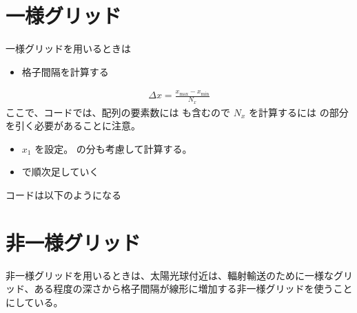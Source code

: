 \documentclass[letterpaper,10pt,dvipdfmx,report]{sphinxmanual}
\begin{document}
\section{一様グリッド}
\label{\detokenize{geometry:id2}}
一様グリッドを用いるときは
\begin{itemize}
\item {} 
格子間隔を計算する

\end{itemize}
\begin{equation*}
\begin{split}\Delta x = \frac{x_\mathrm{max} - x_\mathrm{min}}{N_x}\end{split}
\end{equation*}
ここで、コードでは、配列の要素数には  も含むので
\(N_x\) を計算するには  の部分を引く必要があることに注意。
\begin{itemize}
\item {} 
\(x_1\) を設定。 の分も考慮して計算する。

\item {} 
 で順次足していく

\end{itemize}

コードは以下のようになる

\begin{sphinxVerbatim}[commandchars=\\\{\}]
  
    
   
  
            
\end{sphinxVerbatim}


\section{非一様グリッド}
\label{\detokenize{geometry:id3}}
非一様グリッドを用いるときは、太陽光球付近は、輻射輸送のために一様なグリッド、ある程度の深さから格子間隔が線形に増加する非一様グリッドを使うことにしている。
\end{document}
